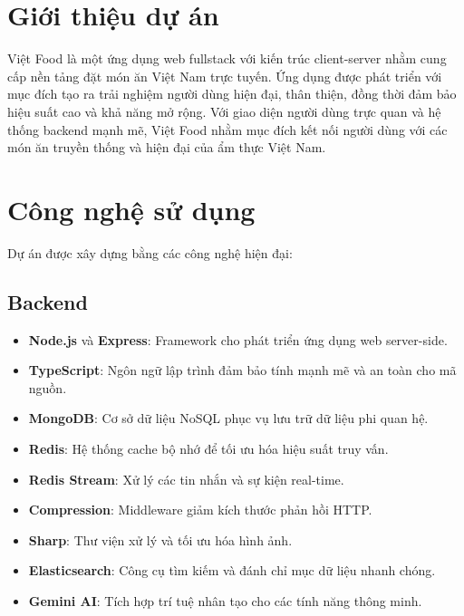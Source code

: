 \section{Giới thiệu dự án}
Việt Food là một ứng dụng web fullstack với kiến trúc client-server nhằm cung cấp nền tảng đặt món ăn Việt Nam trực tuyến. Ứng dụng được phát triển với mục đích tạo ra trải nghiệm người dùng hiện đại, thân thiện, đồng thời đảm bảo hiệu suất cao và khả năng mở rộng. Với giao diện người dùng trực quan và hệ thống backend mạnh mẽ, Việt Food nhằm mục đích kết nối người dùng với các món ăn truyền thống và hiện đại của ẩm thực Việt Nam.

\section{Công nghệ sử dụng}
Dự án được xây dựng bằng các công nghệ hiện đại:

\subsection{Backend}
\begin{itemize}
    \item \textbf{Node.js} và \textbf{Express}: Framework cho phát triển ứng dụng web server-side.
    \item \textbf{TypeScript}: Ngôn ngữ lập trình đảm bảo tính mạnh mẽ và an toàn cho mã nguồn.
    \item \textbf{MongoDB}: Cơ sở dữ liệu NoSQL phục vụ lưu trữ dữ liệu phi quan hệ.
    \item \textbf{Redis}: Hệ thống cache bộ nhớ để tối ưu hóa hiệu suất truy vấn.
    \item \textbf{Redis Stream}: Xử lý các tin nhắn và sự kiện real-time.
    \item \textbf{Compression}: Middleware giảm kích thước phản hồi HTTP.
    \item \textbf{Sharp}: Thư viện xử lý và tối ưu hóa hình ảnh.
    \item \textbf{Elasticsearch}: Công cụ tìm kiếm và đánh chỉ mục dữ liệu nhanh chóng.
    \item \textbf{Gemini AI}: Tích hợp trí tuệ nhân tạo cho các tính năng thông minh.
\end{itemize}

